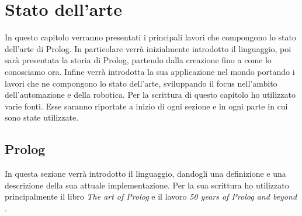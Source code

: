 \clearpage
\newpage
\chapter{Stato dell'arte}
\label{cha:statoarte}
In questo capitolo verranno presentati i principali lavori che compongono lo stato
dell'arte di Prolog. In particolare verrà inizialmente introdotto il linguaggio, poi sarà presentata la storia di Prolog, partendo dalla creazione
fino a come lo conosciamo ora. Infine verrà introdotta la sua applicazione nel mondo portando i lavori che ne compongono lo stato dell'arte, sviluppando il focus nell'ambito dell'automazione e della robotica.
Per la scrittura di questo capitolo ho utilizzato varie fonti. Esse saranno riportate a inizio di ogni sezione e in ogni parte in cui sono state utilizzate.
\section{Prolog}
\label{sec:prolog}
In questa sezione verrà introdotto il linguaggio, dandogli una definizione e una descrizione della sua attuale implementazione. Per la sua scrittura ho utilizzato principalmente il libro \textit{The art of Prolog} \cite{krause_1995} e il lavoro \textit{50 years of Prolog and beyond} \cite{korner2022fifty}.

